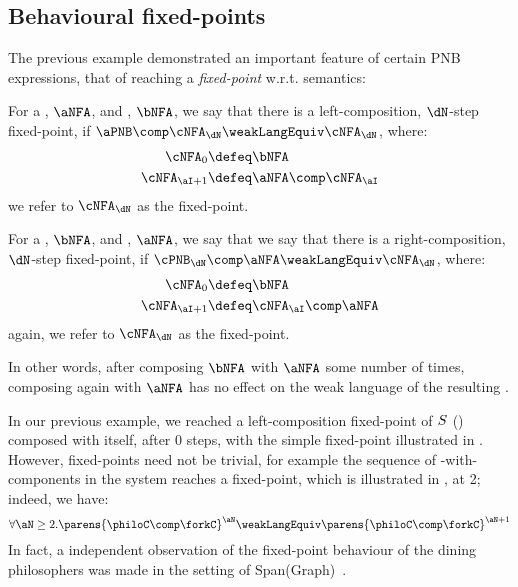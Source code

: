 \subsection{Behavioural fixed-points}\label{sec:fixedPoints}

The previous example demonstrated an important feature of certain PNB
expressions, that of reaching a \emph{fixed-point} w.r.t. \TNFA{} semantics:

\begin{definition}
    For a \NFAB{\aN}{\bN}, $\aNFA$, and \NFAB{\bN}{\cN}, $\bNFA$, we say that
    there is a left-composition, $\dN$-step fixed-point, if $\aPNB \comp
    \cNFA_\dN \weakLangEquiv \cNFA_\dN$, where:
    \begin{align*}
        \cNFA_0 &\defeq \bNFA \\
        \cNFA_{\aI + 1} &\defeq \aNFA \comp \cNFA_\aI
    \end{align*}
    we refer to $\cNFA_\dN$ as the fixed-point.
\end{definition}

\begin{definition}
    For a \NFAB{\aN}{\bN}, $\bNFA$, and \NFAB{\bN}{\cN}, $\aNFA$, we say that
    we say that there is a right-composition, $\dN$-step fixed-point, if
    $\cPNB_\dN \comp \aNFA \weakLangEquiv \cNFA_\dN$, where:
    \begin{align*}
        \cNFA_0 &\defeq \bNFA \\
        \cNFA_{\aI + 1} &\defeq \cNFA_\aI \comp \aNFA
    \end{align*}
    again, we refer to $\cNFA_\dN$ as the fixed-point.
\end{definition}

In other words, after composing $\bNFA$ with $\aNFA$ some number of times,
composing again with $\aNFA$ has no effect on the weak language of the
resulting \TNFA{}.

In our previous example, we reached a left-composition fixed-point of $S$
() composed with itself, after $0$ steps, with the simple
fixed-point illustrated in . However,
fixed-points need not be trivial, for example the sequence of
\philoC{}-with-\forkC{} components in the \diningphilosophersSys{-} system
reaches a fixed-point, which is illustrated in , at
2; indeed, we have:
\[
    \forall \aN \geq 2 . \parens{\philoC \comp \forkC}^\aN \weakLangEquiv \parens{\philoC \comp \forkC}^{\aN + 1}
\]
In fact, a independent observation of the fixed-point behaviour of the dining
philosophers was made in the setting of Span(Graph)~\cite{Katis2004}.

